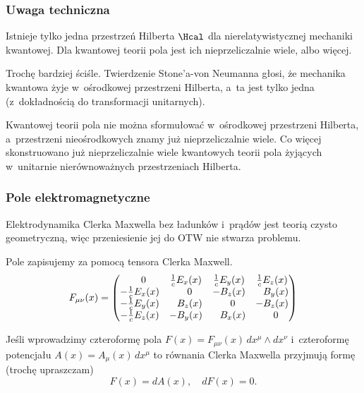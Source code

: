 \documentclass[10pt,t]{beamer}
\begin{document}
\begin{frame}
  \frametitle{Uwaga techniczna}


  Istnieje tylko \alert{jedna} przestrzeń Hilberta $\Hcal$ dla
  nierelatywistycznej mechaniki kwantowej. Dla kwantowej teorii pola
  jest ich nieprzeliczalnie wiele, albo więcej.

  Trochę bardziej ściśle. Twierdzenie Stone’a-von Neumanna głosi, że
  mechanika kwantowa żyje w~ośrodkowej przestrzeni Hilberta, a~ta jest
  tylko jedna (z~dokładnością do transformacji unitarnych).

  Kwantowej teorii pola nie można sformułować w~ośrodkowej przestrzeni
  Hilberta, a~przestrzeni nieośrodkowych znamy już nieprzeliczalnie
  wiele. Co więcej skonstruowano już nieprzeliczalnie wiele kwantowych
  teorii pola żyjących w~unitarnie nierównoważnych przestrzeniach
  Hilberta.

\end{frame}





\begin{frame}
  \frametitle{Pole elektromagnetyczne}


  Elektrodynamika Clerka Maxwella bez ładunków i~prądów jest teorią
  czysto geometryczną, więc przeniesienie jej do OTW nie stwarza
  problemu.

  Pole zapisujemy za pomocą tensora Clerka Maxwell.
  \begin{equation}
    \label{eq:Niespodziewane-teoretyczne-01}
    F_{ \mu \nu }( x )
    =
    \begin{pmatrix}
      \hphantom{-} 0 & \frac{ 1 }{ c } E_{ x }( x ) & \frac{ 1 }{ c }
      E_{ y }( x )
      & \frac{ 1 }{ c } E_{ z }( x ) \\
      -\frac{ 1 }{ c } E_{ x }( x ) & \hphantom{-} 0 & -B_{ z }( x )
      & \hphantom{-} B_{ y }( x ) \\
      -\frac{ 1 }{ c } E_{ y }( x ) & \hphantom{-} B_{ z }( x )
      & \hphantom{-} 0 & -B_{ z }( x ) \\
      -\frac{ 1 }{ c } E_{ z }( x ) & -B_{ y }( x ) & \hphantom{-} B_{
        x }( x ) & \hphantom{-} 0
    \end{pmatrix}
  \end{equation}

  Jeśli wprowadzimy czteroformę pola
  $F( x ) = F_{ \mu \nu }( x ) \, dx^{ \mu } \wedge dx^{ \nu }$
  i~czteroformę potencjału $A( x ) = A_{ \mu }( x ) \, dx^{ \mu }$ to
  równania Clerka Maxwella przyjmują formę (trochę upraszczam)
  \begin{equation}
    \label{eq:Niespodziewane-teoretyczne-02}
    F( x ) = dA( x ), \quad
    dF( x ) = 0.
  \end{equation}

\end{frame}
\end{document}
